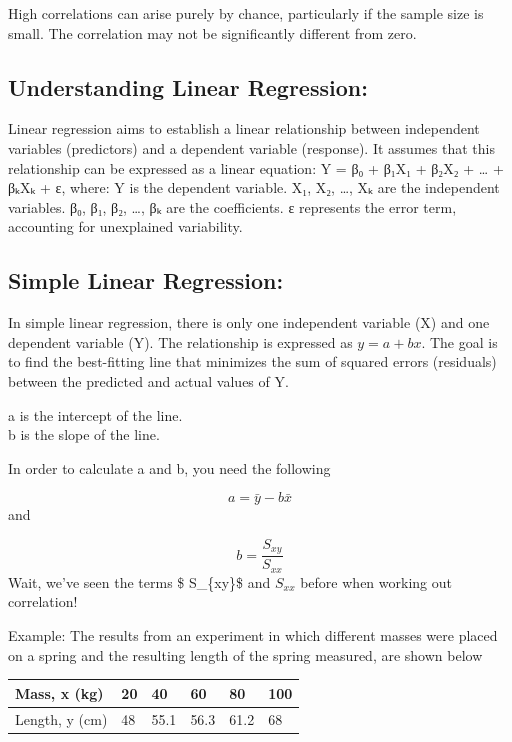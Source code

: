 \documentclass[
  letterpaper,
  DIV=11,
  numbers=noendperiod]{scrartcl}
\begin{document}
High correlations can arise purely by chance, particularly if the sample
size is small. The correlation may not be significantly different from
zero.

\subsection{Understanding Linear
Regression:}\label{understanding-linear-regression}

Linear regression aims to establish a linear relationship between
independent variables (predictors) and a dependent variable (response).
It assumes that this relationship can be expressed as a linear equation:
Y = β₀ + β₁X₁ + β₂X₂ + \ldots{} + βₖXₖ + ε, where: Y is the dependent
variable. X₁, X₂, \ldots, Xₖ are the independent variables. β₀, β₁, β₂,
\ldots, βₖ are the coefficients. ε represents the error term, accounting
for unexplained variability.

\subsection{Simple Linear Regression:}\label{simple-linear-regression}

In simple linear regression, there is only one independent variable (X)
and one dependent variable (Y). The relationship is expressed as
\(y=a+bx\). The goal is to find the best-fitting line that minimizes the
sum of squared errors (residuals) between the predicted and actual
values of Y.

a is the intercept of the line.\\
b is the slope of the line.

In order to calculate a and b, you need the following

\[ a = \bar{y} - b\bar{x}\] and

\[ b = \frac{S_{xy}}{S_{xx}} \] Wait, we've seen the terms \$
S\_\{xy\}\$ and \(S_{xx}\) before when working out correlation!

Example: The results from an experiment in which different masses were
placed on a spring and the resulting length of the spring measured, are
shown below

\begin{longtable}[]{@{}llllll@{}}
\toprule\noalign{}
Mass, x (kg) & 20 & 40 & 60 & 80 & 100 \\
\midrule\noalign{}
\endhead
\bottomrule\noalign{}
\endlastfoot
Length, y (cm) & 48 & 55.1 & 56.3 & 61.2 & 68 \\
\end{longtable}
\end{document}
